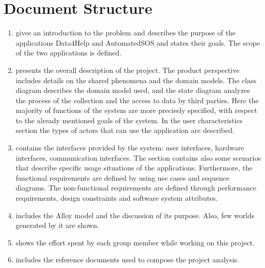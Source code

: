 \section{Document Structure}
\begin{enumerate} [label={Section \arabic*}]
    \item gives an introduction to the problem and describes the purpose of the applications Data4Help and AutomatedSOS and states their goals. The scope of the two applications is defined.
    \item presents the overall description of the project. The product perspective includes details on the shared phenomena and the domain models. The class diagram describes the domain model used, and the state diagram analyzes the process of the collection and the access to data by third parties. Here the majority of functions of the system are more precisely specified, with respect to the already mentioned goals of the system. In the user characteristics section the types of actors that can use the application are described.
    \item contains the interfaces provided by the system: user interfaces, hardware interfaces, communication interfaces. The section contains also some scenarios that describe specific usage situations of the applications. Furthermore, the functional requirements are defined by using use cases and sequence diagrams.
    The non-functional requirements are defined through performance requirements, design constraints and software system attributes.
    \item includes the Alloy model and the discussion of its purpose. Also, few worlds generated by it are shown.
    \item shows the effort spent by each group member while working on this project.
    \item includes the reference documents used to  compose the project analysis.
\end{enumerate}